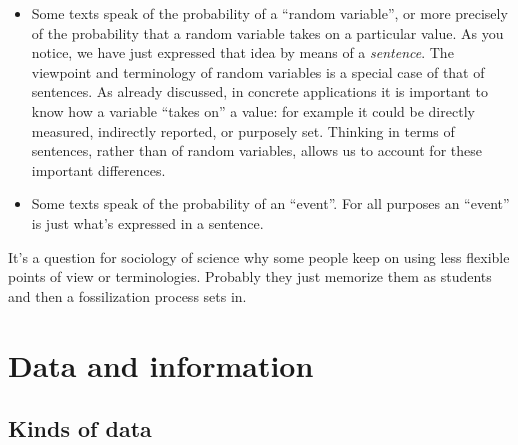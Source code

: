 \documentclass[
  a4paper,
  DIV=11,
  numbers=noendperiod,
  oneside]{scrreprt}
\begin{document}
\begin{tcolorbox}[enhanced jigsaw, colback=white, titlerule=0mm, toptitle=1mm, breakable, colbacktitle=quarto-callout-important-color!10!white, opacitybacktitle=0.6, colframe=quarto-callout-important-color-frame, opacityback=0, arc=.35mm, leftrule=.75mm, title={\faIcon{exclamation-circle} Differences in terminology}, left=2mm, bottomtitle=1mm, rightrule=.15mm, bottomrule=.15mm, toprule=.15mm, coltitle=black]

\begin{itemize}
\item
  Some texts speak of the probability of a ``random\footnotemark{}
  variable'', or more precisely of the probability that a random
  variable takes on a particular value. As you notice, we have just
  expressed that idea by means of a \emph{sentence}. The viewpoint and
  terminology of random variables is a special case of that of
  sentences. As already discussed, in concrete applications it is
  important to know how a variable ``takes on'' a value: for example it
  could be directly measured, indirectly reported, or purposely set.
  Thinking in terms of sentences, rather than of random variables,
  allows us to account for these important differences.
\item
  Some texts speak of the probability of an ``event''. For all purposes
  an ``event'' is just what's expressed in a sentence.
\end{itemize}

It's a question for sociology of science why some people keep on using
less flexible points of view or terminologies. Probably they just
memorize them as students and then a fossilization process sets in.

\end{tcolorbox}


\hypertarget{data-and-information}{%
\chapter{Data and information}\label{data-and-information}}

\hypertarget{kinds-of-data}{%
\section{Kinds of data}\label{kinds-of-data}}
\end{document}
